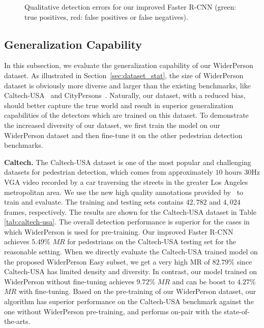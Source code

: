\documentclass[journal]{IEEEtran}
\begin{document}
\begin{figure*}[t]
\centering
{}
\caption{Qualitative detection errors for our improved Faster R-CNN (green: true positives, red: false positives or false negatives).}
\label{fig:qualitative_mistakes}
\end{figure*}

\subsection{Generalization Capability}
In this subsection, we evaluate the generalization capability of our WiderPerson dataset. As illustrated in Section~\ref{sec:dataset_stat}, the size of WiderPerson dataset is obviously more diverse and larger than the existing benchmarks, like Caltech-USA~\cite{DBLP:journals/pami/DollarWSP12} and CityPersons~\cite{DBLP:conf/cvpr/ZhangBS17}. Naturally, our dataset, with a reduced bias, should better capture the true world and result in superior generalization capabilities of the detectors which are trained on this dataset. To demonstrate the increased diversity of our dataset, we first train the model on our WiderPerson dataset and then fine-tune it on the other pedestrian detection benchmarks.

{\flushleft \textbf{Caltech. }}
The Caltech-USA dataset is one of the most popular and challenging datasets for pedestrian detection, which comes from approximately $10$ hours $30$Hz VGA video recorded by a car traversing the streets in the greater Los Angeles metropolitan area. We use the new high quality annotations provided by~\cite{DBLP:conf/cvpr/ZhangBOHS16} to train and evaluate. The training and testing sets contains $42,782$ and $4,024$ frames, respectively. The results are shown for the Caltech-USA dataset in Table \ref{tab:caltech-usa}. The overall detection performance is superior for the cases in which WiderPerson is used for pre-training. Our improved Faster R-CNN achieves $5.49\%$ $MR$ for pedestrians on the Caltech-USA testing set for the reasonable setting. When we directly evaluate the Caltech-USA trained model on the proposed WiderPerson Easy subset, we get a very high MR of $82.79\%$ since Caltech-USA has limited density and diversity. In contrast, our model trained on WiderPerson without fine-tuning achieves $9.72\%$ $MR$ and can be boost to $4.27\%$ $MR$ with fine-tuning. Based on the pre-training of our WiderPerson dataset, our algorithm has superior performance on the Caltech-USA benchmark against the one without WiderPerson pre-training, and performs on-pair with the state-of-the-arts.
\end{document}
